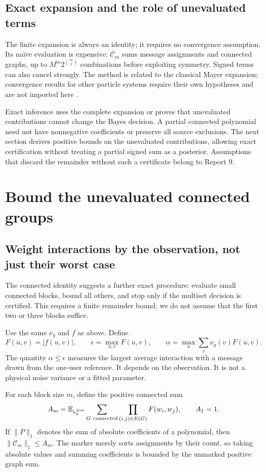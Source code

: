 \documentclass[10pt,a4paper]{article}
\newcommand{\E}{\mathbb E}
\begin{document}
\subsection{Exact expansion and the role of unevaluated terms}
The finite expansion is always an identity; it requires no convergence assumption.
Its naive evaluation is expensive: $\mathcal C_m$ sums message assignments and connected graphs, up to
$M^m2^{\binom m2}$ combinations before exploiting symmetry. Signed terms can also cancel strongly.
The method is related to the classical Mayer expansion; convergence results for other particle systems
require their own hypotheses and are not imported here \cite{pulvirenti}.

Exact inference uses the complete expansion or proves that unevaluated contributions cannot change the
Bayes decision. A partial connected polynomial need not have nonnegative coefficients or preserve all source
exclusions. The next section derives positive bounds on the unevaluated contributions, allowing exact
certification without treating a partial signed sum as a posterior. Assumptions that discard the remainder
without such a certificate belong to Report 9.

\clearpage
\section{Bound the unevaluated connected groups}
\label{sec:connected-bound}
\subsection{Weight interactions by the observation, not just their worst case}
The connected identity suggests a further exact procedure: evaluate small connected blocks, bound all others,
and stop only if the multiset decision is certified. This requires a finite remainder bound; we do not assume
that the first two or three blocks suffice.

Use the same $\nu_y$ and $f$ as above. Define
\begin{equation}
 F(u,v)=|f(u,v)|,\qquad
 \epsilon=\max_{u,v}F(u,v),\qquad
 \alpha=\max_u\sum_v\nu_y(v)F(u,v).
 \label{eq:weighted-interaction}
\end{equation}
The quantity $\alpha\leq\epsilon$ measures the largest average interaction with a message drawn from the
one-user reference. It depends on the observation. It is not a physical noise variance or a fitted parameter.

For each block size $m$, define the positive connected sum
\[
 A_m=\E_{\nu_y^{\otimes m}}
       \sum_{G\ {\rm connected}}\prod_{(i,j)\in E(G)}F(w_i,w_j),\qquad A_1=1.
\]
If $\|P\|_1$ denotes the sum of absolute coefficients of a polynomial, then
$\|\mathcal C_m\|_1\leq A_m$. The marker merely sorts assignments by their count, so taking absolute values
and summing coefficients is bounded by the unmarked positive graph sum.
\end{document}
